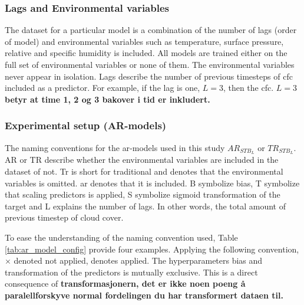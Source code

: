 \subsubsection{Lags and Environmental variables}
The dataset for a particular model is a combination of the number of lags (order of model) and environmental variables such as temperature, surface pressure, relative and specific humidity
is included. All models are trained either on the full set of environmental variables or none of them. %
The environmental variables never appear in isolation. Lags describe the number of previous timesteps of \acrshort{cfc} included as a predictor. For example, if the lag is one, $L=3$, then the \acrshort{cfc}.
\textbf{$L=3$ betyr at time 1, 2 og 3 bakover i tid er inkludert.}


\subsubsection{Experimental setup (AR-models)}
The naming conventions for the \acrshort{ar}-models used in this study $AR_{STB_L}$ or $TR_{STB_L}$. AR or TR describe whether the environmental variables are included in the dataset of not. Tr is short for traditional and denotes that the environmental variables is omitted. \acrshort{ar} denotes that it is included. B symbolize bias, T symbolize that scaling predictors is applied, S symbolize sigmoid transformation of the target and L explains the number of lags. In other words, the total amount of previous timestep of cloud cover. 

To ease the understanding of the naming convention used, Table \ref{tab:ar_model_config} provide four examples. Applying the following convention, $\times$ denoted not applied, \checked denotes applied.
The hyperparameters bias and transformation of the predictors is mutually exclusive. This is a direct consequence of \textbf{transformasjonern, det er ikke noen poeng å paralellforskyve normal fordelingen du har transformert dataen til.}

